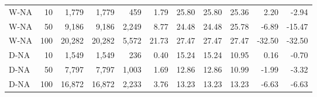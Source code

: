 \begin{table}[htbp]
\begin{tabular}{lrrrrrrrrrr}
W-NA & 10 & 1,779 & 1,779 & 459 & 1.79 & 25.80 & 25.80 & 25.36 & 2.20 & -2.94\\
W-NA & 50 & 9,186 & 9,186 & 2,249 & 8.77 & 24.48 & 24.48 & 25.78 & -6.89 & -15.47\\
W-NA & 100 & 20,282 & 20,282 & 5,572 & 21.73 & 27.47 & 27.47 & 27.47 & -32.50 & -32.50\\
D-NA & 10 & 1,549 & 1,549 & 236 & 0.40 & 15.24 & 15.24 & 10.95 & 0.16 & -0.70\\
D-NA & 50 & 7,797 & 7,797 & 1,003 & 1.69 & 12.86 & 12.86 & 10.99 & -1.99 & -3.32\\
D-NA & 100 & 16,872 & 16,872 & 2,233 & 3.76 & 13.23 & 13.23 & 13.23 & -6.63 & -6.63\\
\bottomrule
\end{tabular}
\end{table}
